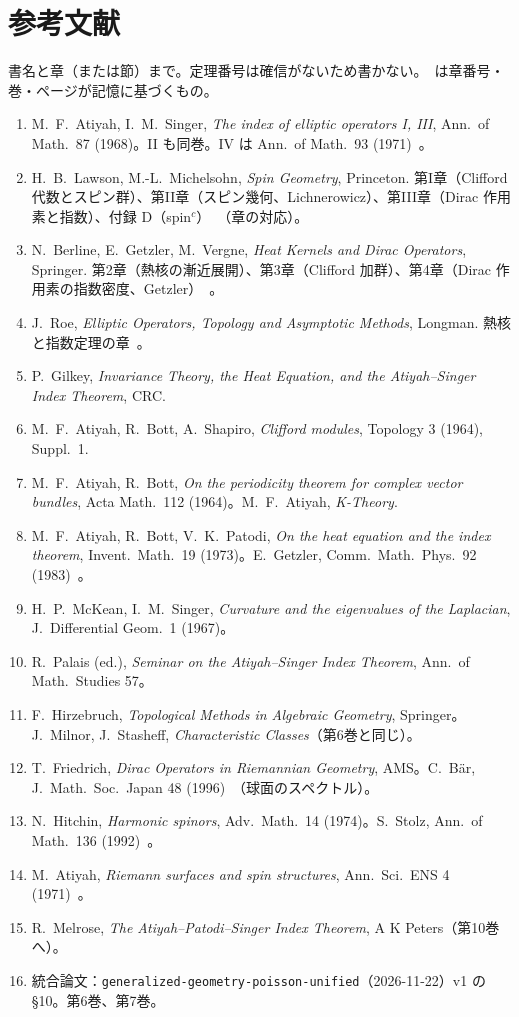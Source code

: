 \section*{参考文献}
書名と章（または節）まで。定理番号は確信がないため書かない。\tQ\ は章番号・巻・ページが記憶に基づくもの。
\begin{enumerate}
\item M.~F.~Atiyah, I.~M.~Singer, \emph{The index of elliptic operators I, III}, Ann.\ of Math.\ 87 (1968)。II も同巻。IV は Ann.\ of Math.\ 93 (1971)\tQ\ 。
\item H.~B.~Lawson, M.-L.~Michelsohn, \emph{Spin Geometry}, Princeton. 第I章（Clifford 代数とスピン群）、第II章（スピン幾何、Lichnerowicz）、第III章（Dirac 作用素と指数）、付録 D（spin$^c$）\tQ\ （章の対応）。
\item N.~Berline, E.~Getzler, M.~Vergne, \emph{Heat Kernels and Dirac Operators}, Springer. 第2章（熱核の漸近展開）、第3章（Clifford 加群）、第4章（Dirac 作用素の指数密度、Getzler）\tQ\ 。
\item J.~Roe, \emph{Elliptic Operators, Topology and Asymptotic Methods}, Longman. 熱核と指数定理の章\tQ\ 。
\item P.~Gilkey, \emph{Invariance Theory, the Heat Equation, and the Atiyah--Singer Index Theorem}, CRC.
\item M.~F.~Atiyah, R.~Bott, A.~Shapiro, \emph{Clifford modules}, Topology 3 (1964), Suppl.~1.
\item M.~F.~Atiyah, R.~Bott, \emph{On the periodicity theorem for complex vector bundles}, Acta Math.\ 112 (1964)。M.~F.~Atiyah, \emph{K-Theory}.
\item M.~F.~Atiyah, R.~Bott, V.~K.~Patodi, \emph{On the heat equation and the index theorem}, Invent.\ Math.\ 19 (1973)。E.~Getzler, Comm.\ Math.\ Phys.\ 92 (1983)\tQ\ 。
\item H.~P.~McKean, I.~M.~Singer, \emph{Curvature and the eigenvalues of the Laplacian}, J.\ Differential Geom.\ 1 (1967)。
\item R.~Palais (ed.), \emph{Seminar on the Atiyah--Singer Index Theorem}, Ann.\ of Math.\ Studies 57。
\item F.~Hirzebruch, \emph{Topological Methods in Algebraic Geometry}, Springer。J.~Milnor, J.~Stasheff, \emph{Characteristic Classes}（第6巻と同じ）。
\item T.~Friedrich, \emph{Dirac Operators in Riemannian Geometry}, AMS。C.~Bär, J.\ Math.\ Soc.\ Japan 48 (1996)\tQ\ （球面のスペクトル）。
\item N.~Hitchin, \emph{Harmonic spinors}, Adv.\ Math.\ 14 (1974)。S.~Stolz, Ann.\ of Math.\ 136 (1992)\tQ\ 。
\item M.~Atiyah, \emph{Riemann surfaces and spin structures}, Ann.\ Sci.\ ENS 4 (1971)\tQ\ 。
\item R.~Melrose, \emph{The Atiyah--Patodi--Singer Index Theorem}, A K Peters（第10巻へ）。
\item 統合論文：\texttt{generalized-geometry-poisson-unified}（2026-11-22）v1 の \S10。第6巻、第7巻。
\end{enumerate}


